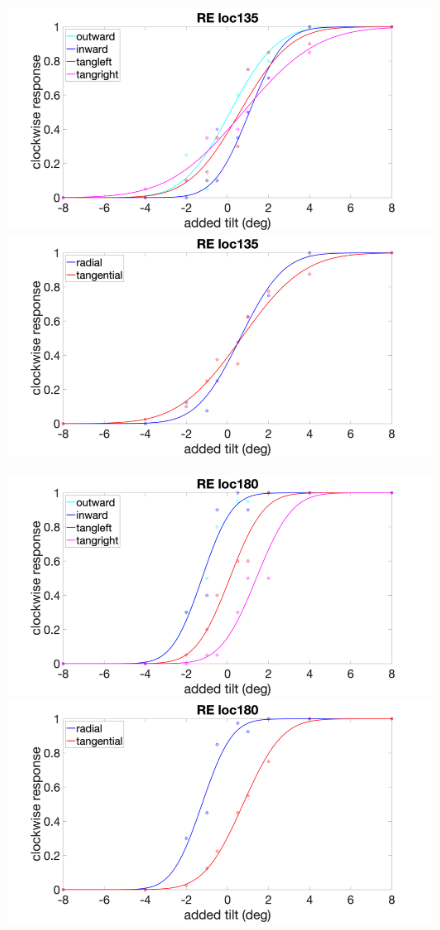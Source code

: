 \documentclass[11pt]{article} %
\begin{document}
\begin{figure}[H]
\centering %
\includegraphics[scale=.15]{Images/RE_PF_loc135_4conds.png}
\includegraphics[scale=.15]{Images/RE_PF_loc135_2conds.png}
\end{figure}
\begin{figure}[H]
\centering %
\includegraphics[scale=.15]{Images/RE_PF_loc180_4conds.png}
\includegraphics[scale=.15]{Images/RE_PF_loc180_2conds.png}
\end{figure}
\end{document}
